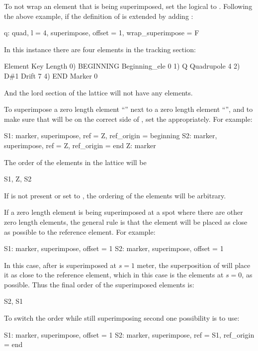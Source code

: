 To not wrap an element that is being superimposed, set the  logical to .
Following the above example, if the definition of is extended by adding :
\begin{example}
  q: quad, l = 4, superimpose, offset = 1, wrap_superimpose = F
\end{example}
In this instance there are four elements in the tracking section:
\begin{example}
        Element    Key             Length
  0)    BEGINNING  Beginning_ele   0
  1)    Q          Quadrupole      4    
  2)    D{\#}1        Drift           7
  4)    END        Marker          0
\end{example}
And the lord section of the lattice will not have any elements.

To superimpose a zero length element ``'' next to a zero length element ``'', and to
make sure that  will be on the correct side of , set the  appropriately.
For example:
\begin{example}
  S1: marker, superimpose, ref = Z, ref_origin = beginning
  S2: marker, superimpose, ref = Z, ref_origin = end
  Z: marker
\end{example}
The order of the elements in the lattice will be
\begin{example}
  S1, Z, S2
\end{example}
If  is not present or set to , the ordering of the elements will be
arbitrary.

If a zero length element is being superimposed at a spot where there are other zero length elements,
the general rule is that the element will be placed as close as possible to the reference element.
For example:
\begin{example}
  S1: marker, superimpose, offset = 1
  S2: marker, superimpose, offset = 1
\end{example}
In this case, after  is superimposed at $s = 1$ meter, the superposition of  will
place it as close to the reference element, which in this case is the  elements at $s
= 0$, as possible. Thus the final order of the superimposed elements is:
\begin{example}
  S2, S1
\end{example}
To switch the order while still superimposing  second one possibility is to use:
\begin{example}
  S1: marker, superimpose, offset = 1
  S2: marker, superimpose, ref = S1, ref_origin = end
\end{example}

